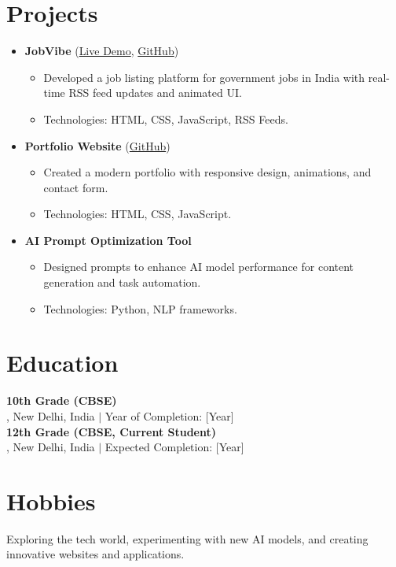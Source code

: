 \documentclass[a4paper,10pt]{article}
\begin{document}
\section*{Projects}
\begin{itemize}[leftmargin=*,itemsep=2pt]
    \item \textbf{JobVibe} (\href{https://akatriggered.github.io/JobVibe/#home}{Live Demo}, \href{https://github.com/AkaTriggered/JobVibe}{GitHub})
    \begin{itemize}[leftmargin=*,itemsep=1pt]
        \item Developed a job listing platform for government jobs in India with real-time RSS feed updates and animated UI.
        \item Technologies: HTML, CSS, JavaScript, RSS Feeds.
    \end{itemize}
    \item \textbf{Portfolio Website} (\href{https://github.com/AkaTriggered}{GitHub})
    \begin{itemize}[leftmargin=*,itemsep=1pt]
        \item Created a modern portfolio with responsive design, animations, and contact form.
        \item Technologies: HTML, CSS, JavaScript.
    \end{itemize}
    \item \textbf{AI Prompt Optimization Tool}
    \begin{itemize}[leftmargin=*,itemsep=1pt]
        \item Designed prompts to enhance AI model performance for content generation and task automation.
        \item Technologies: Python, NLP frameworks.
    \end{itemize}
\end{itemize}

\section*{Education}
\textbf{10th Grade (CBSE)} \\
[School Name], New Delhi, India $|$ Year of Completion: [Year] \\
\textbf{12th Grade (CBSE, Current Student)} \\
[School Name], New Delhi, India $|$ Expected Completion: [Year]

\section*{Hobbies}
Exploring the tech world, experimenting with new AI models, and creating innovative websites and applications.
\end{document}
